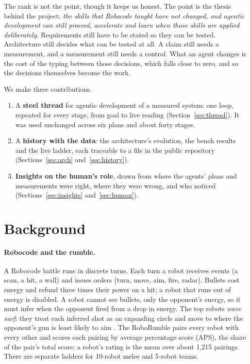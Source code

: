 \documentclass[10pt,twocolumn]{article}
\begin{document}
The rank is not the point, though it keeps us honest. The point is the thesis behind the project:
\emph{the skills that Robocode taught have not changed, and agentic development can still proceed,
accelerate and learn when those skills are applied deliberately}. Requirements still have to be
stated so they can be tested. Architecture still decides what can be tested at all. A claim still
needs a measurement, and a measurement still needs a control. What an agent changes is the cost of
the typing between those decisions, which falls close to zero, and so the decisions themselves
become the work.

We make three contributions.
\begin{enumerate}
\item A \textbf{steel thread} for agentic development of a measured system: one loop, repeated for
  every stage, from goal to live reading (Section~\ref{sec:thread}). It was used unchanged across
  six plans and about forty stages.
\item A \textbf{history with the data}: the architecture's evolution, the bench results and the live
  ladder, each traceable to a file in the public repository \cite{hadurrepo}
  (Sections~\ref{sec:arch} and~\ref{sec:history}).
\item \textbf{Insights on the human's role}, drawn from where the agents' plans and measurements
  were right, where they were wrong, and who noticed (Sections~\ref{sec:insights}
  and~\ref{sec:human}).
\end{enumerate}

\section{Background}\label{sec:background}

\paragraph{Robocode and the rumble.} A Robocode battle runs in discrete turns. Each turn a robot
receives events (a scan, a hit, a wall) and issues orders (turn, move, aim, fire, radar). Bullets
cost energy and refund three times their power on a hit; a robot that runs out of energy is
disabled. A robot cannot see bullets, only the opponent's energy, so it must infer when the
opponent fired from a drop in energy. The top robots \emph{wave surf}: they treat each inferred
shot as an expanding circle and move to where the opponent's gun is least likely to aim
\cite{robowiki}. The RoboRumble pairs every robot with every other and scores each pairing by
average percentage score (APS), the share of the pair's total score; a robot's rating is the mean
over about 1,215 pairings. There are separate ladders for 10-robot melee and 5-robot teams.
\end{document}
